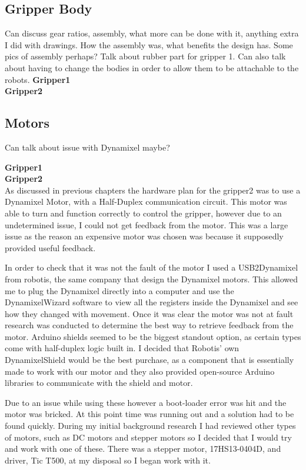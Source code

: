 \documentclass{l4proj}
\begin{document}
\subsection{Gripper Body}
Can discuss gear ratios, assembly, what more can be done with it, anything extra I did with drawings. How the assembly was, what benefits the design has. Some pics of assembly perhaps? Talk about rubber part for gripper 1.
Can also talk about having to change the bodies in order to allow them to be attachable to the robots. 
\textbf{Gripper1}\\

\textbf{Gripper2}\\


\subsection{Motors}
Can talk about issue with Dynamixel maybe? 

\textbf{Gripper1}\\

\textbf{Gripper2} \\
As discussed in previous chapters the hardware plan for the gripper2 was to use a Dynamixel Motor, with a Half-Duplex communication circuit. This motor was able to turn and function correctly to control the gripper, however due to an undetermined issue, I could not get feedback from the motor. This was a large issue as the reason an expensive motor was chosen was because it supposedly provided useful feedback. 

In order to check that it was not the fault of the motor I used a USB2Dynamixel from robotis, the same company that design the Dynamixel motors. This allowed me to plug the Dynamixel directly into a computer and use the DynamixelWizard software to view all the registers inside the Dynamixel and see how they changed with movement. Once it was clear the motor was not at fault research was conducted to determine the best way to retrieve feedback from the motor. Arduino shields seemed to be the biggest standout option, as certain types come with half-duplex logic built in. I decided that Robotis' own DynamixelShield would be the best purchase, as a component that is essentially made to work with our motor and they also provided open-source Arduino libraries to communicate with the shield and motor. 

Due to an issue while using these however a boot-loader error was hit and the motor was bricked. At this point time was running out and a solution had to be found quickly. During my initial background research I had reviewed other types of motors, such as DC motors and stepper motors so I decided that I would try and work with one of these. There was a stepper motor, 17HS13-0404D, and driver, Tic T500, at my disposal so I began work with it. 
\end{document}
